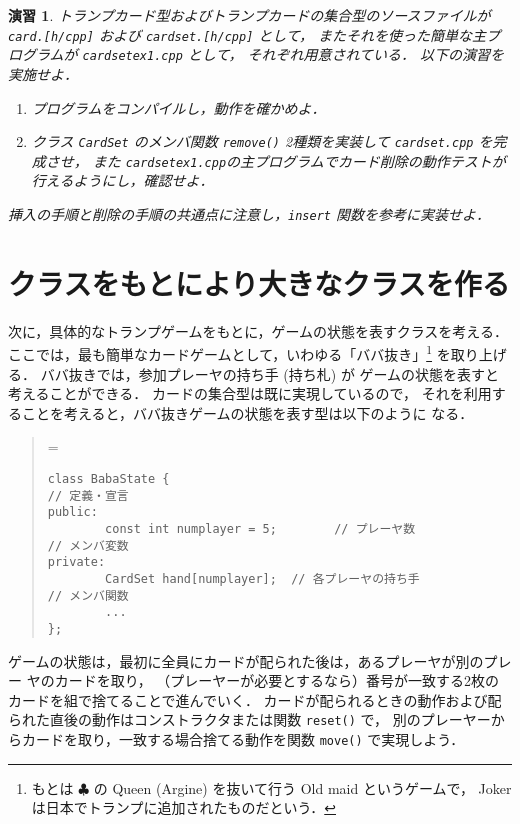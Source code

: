 \documentclass[11pt,a4,epsf]{jarticle}
\def\linesparpage#1{\baselineskip=\textheight\divide\baselineskip#1}
\newtheorem{exerc}{演習}
\begin{document}
\begin{exerc} %
トランプカード型およびトランプカードの集合型のソースファイルが
\verb+card.[h/cpp]+ および \verb+cardset.[h/cpp]+ として，
またそれを使った簡単な主プログラムが \verb+cardsetex1.cpp+ として，
それぞれ用意されている．
以下の演習を実施せよ．

\begin{enumerate}

\item[(1)] プログラムをコンパイルし，動作を確かめよ．

\item[(2)] クラス \verb+CardSet+ のメンバ関数 \verb+remove()+ 2種類を実装して \verb+cardset.cpp+ を完成させ，
また \verb+cardsetex1.cpp+の主プログラムでカード削除の動作テストが行えるようにし，確認せよ．
\end{enumerate}
挿入の手順と削除の手順の共通点に注意し，\verb+insert+ 関数を参考に実装せよ．
\end{exerc} %


\section{クラスをもとにより大きなクラスを作る}

次に，具体的なトランプゲームをもとに，ゲームの状態を表すクラスを考える．
ここでは，最も簡単なカードゲームとして，いわゆる「ババ抜き」\footnote{もとは $\clubsuit$ の Queen
(Argine) を抜いて行う Old maid というゲームで，
Joker は日本でトランプに追加されたものだという．}
を取り上げる．
ババ抜きでは，参加プレーヤの持ち手 (持ち札) が
ゲームの状態を表すと考えることができる．
カードの集合型は既に実現しているので，
それを利用することを考えると，ババ抜きゲームの状態を表す型は以下のように
なる．
\begin{quote}
\linesparpage{50}
\begin{verbatim}
class BabaState {
// 定義・宣言
public:
        const int numplayer = 5;        // プレーヤ数
// メンバ変数
private:
        CardSet hand[numplayer];  // 各プレーヤの持ち手
// メンバ関数
        ...
};
\end{verbatim}
\end{quote}

ゲームの状態は，最初に全員にカードが配られた後は，あるプレーヤが別のプレー
ヤのカードを取り，
（プレーヤーが必要とするなら）番号が一致する2枚のカードを組で捨てることで進んでいく．
カードが配られるときの動作および配られた直後の動作はコンストラクタまたは関数 \verb+reset()+ で，
別のプレーヤーからカードを取り，一致する場合捨てる動作を関数 \verb+move()+ で実現しよう．
\end{document}
